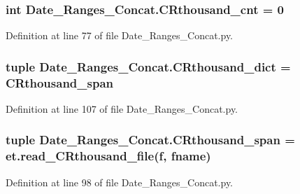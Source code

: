 \subsubsection[{C\+Rthousand\+\_\+cnt}]{\setlength{\rightskip}{0pt plus 5cm}int Date\+\_\+\+Ranges\+\_\+\+Concat.\+C\+Rthousand\+\_\+cnt = 0}\label{namespace_date___ranges___concat_af8527316eb015c858bcbf22aa4a3ead8}


Definition at line 77 of file Date\+\_\+\+Ranges\+\_\+\+Concat.\+py.

\hypertarget{namespace_date___ranges___concat_a527828f48f96289fef64fc5b6f3391ed}{}
\subsubsection[{C\+Rthousand\+\_\+dict}]{\setlength{\rightskip}{0pt plus 5cm}tuple Date\+\_\+\+Ranges\+\_\+\+Concat.\+C\+Rthousand\+\_\+dict = {\bf C\+Rthousand\+\_\+span}}\label{namespace_date___ranges___concat_a527828f48f96289fef64fc5b6f3391ed}


Definition at line 107 of file Date\+\_\+\+Ranges\+\_\+\+Concat.\+py.

\hypertarget{namespace_date___ranges___concat_ab1f6fe2daf46f0f39aaa5ea22ca94dd4}{}
\subsubsection[{C\+Rthousand\+\_\+span}]{\setlength{\rightskip}{0pt plus 5cm}tuple Date\+\_\+\+Ranges\+\_\+\+Concat.\+C\+Rthousand\+\_\+span = et.\+read\+\_\+\+C\+Rthousand\+\_\+file({\bf f}, {\bf fname})}\label{namespace_date___ranges___concat_ab1f6fe2daf46f0f39aaa5ea22ca94dd4}


Definition at line 98 of file Date\+\_\+\+Ranges\+\_\+\+Concat.\+py.

\hypertarget{namespace_date___ranges___concat_a0ca32bca90b9650a04d4032d34c06410}{}
